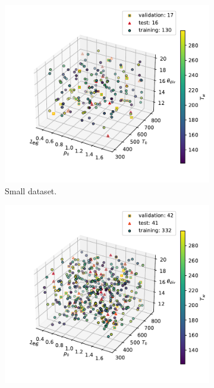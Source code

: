 \begin{figure}[t]
    \centering
    \begin{subfigure}{0.3\textwidth}
        \centering
        \includegraphics[width=\linewidth]{Figuras/lhs/data_Tw/doe_200/lhs_all.pdf}  
        \caption{Small dataset.}
        \label{fig:lhs_Tw_200}
    \end{subfigure}
    \begin{subfigure}{0.3\textwidth}
        \centering
        \includegraphics[width=\linewidth]{Figuras/lhs/data_Tw/doe_500/lhs_all.pdf}  

\end{subfigure}
\end{figure}
